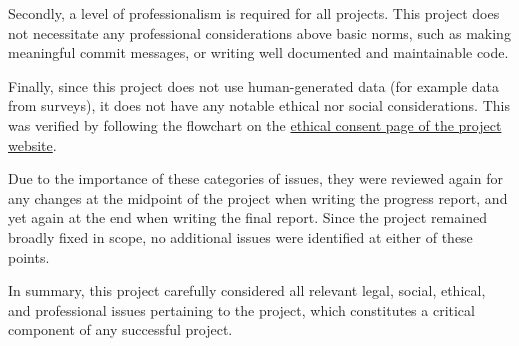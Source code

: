 Secondly, a level of professionalism is required for all projects. This project does not necessitate any professional considerations above basic norms, such as making meaningful commit messages, or writing well documented and maintainable code.

Finally, since this project does not use human-generated data (for example data from surveys), it does not have any notable ethical nor social considerations. This was verified by following the flowchart on the \href{https://warwick.ac.uk/fac/sci/dcs/teaching/ethics}{ethical consent page of the project website}.

Due to the importance of these categories of issues, they were reviewed again for any changes at the midpoint of the project when writing the progress report, and yet again at the end when writing the final report. Since the project remained broadly fixed in scope, no additional issues were identified at either of these points.

In summary, this project carefully considered all relevant legal, social, ethical, and professional issues pertaining to the project, which constitutes a critical component of any successful project.

